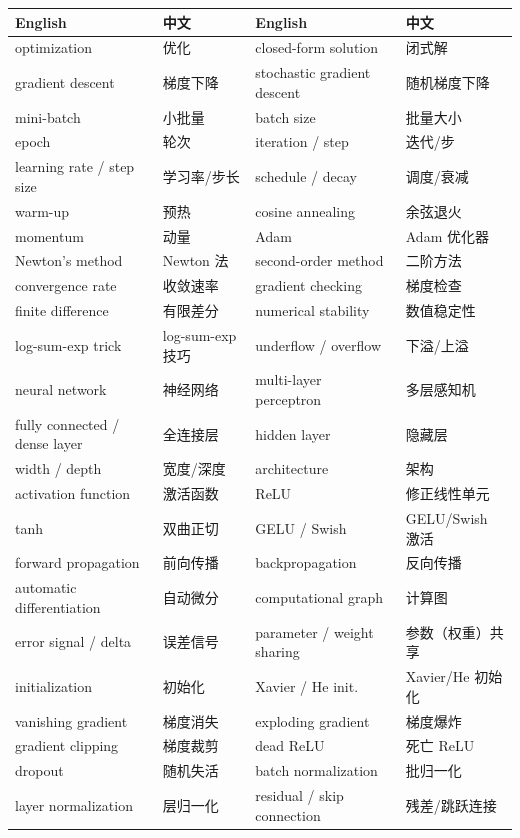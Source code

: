 \documentclass[UTF8,a4paper,11pt]{ctexart}
\theoremstyle{definition}
\theoremstyle{plain}
\theoremstyle{remark}
\begin{document}
\begin{center}
\small
\setlength{\tabcolsep}{3pt}
\begin{tabular}{@{}llll@{}}
\toprule
English & 中文 & English & 中文\\
\midrule
optimization & 优化 & closed-form solution & 闭式解\\
gradient descent & 梯度下降 & stochastic gradient descent & 随机梯度下降\\
mini-batch & 小批量 & batch size & 批量大小\\
epoch & 轮次 & iteration / step & 迭代/步\\
learning rate / step size & 学习率/步长 & schedule / decay & 调度/衰减\\
warm-up & 预热 & cosine annealing & 余弦退火\\
momentum & 动量 & Adam & Adam 优化器\\
Newton's method & Newton 法 & second-order method & 二阶方法\\
convergence rate & 收敛速率 & gradient checking & 梯度检查\\
finite difference & 有限差分 & numerical stability & 数值稳定性\\
log-sum-exp trick & log-sum-exp 技巧 & underflow / overflow & 下溢/上溢\\
neural network & 神经网络 & multi-layer perceptron & 多层感知机\\
fully connected / dense layer & 全连接层 & hidden layer & 隐藏层\\
width / depth & 宽度/深度 & architecture & 架构\\
activation function & 激活函数 & ReLU & 修正线性单元\\
tanh & 双曲正切 & GELU / Swish & GELU/Swish 激活\\
forward propagation & 前向传播 & backpropagation & 反向传播\\
automatic differentiation & 自动微分 & computational graph & 计算图\\
error signal / delta & 误差信号 & parameter / weight sharing & 参数（权重）共享\\
initialization & 初始化 & Xavier / He init. & Xavier/He 初始化\\
vanishing gradient & 梯度消失 & exploding gradient & 梯度爆炸\\
gradient clipping & 梯度裁剪 & dead ReLU & 死亡 ReLU\\
dropout & 随机失活 & batch normalization & 批归一化\\
layer normalization & 层归一化 & residual / skip connection & 残差/跳跃连接\\

\end{tabular}
\end{center}
\end{document}
